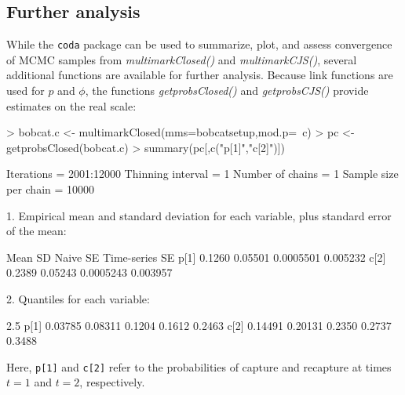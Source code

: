 \documentclass[12pt]{article}
\begin{document}
\subsection{Further analysis}
While the \verb|coda| package can be used to summarize, plot, and assess convergence of MCMC samples from \textit{multimarkClosed()} and \textit{multimarkCJS()}, several additional functions are available for further analysis. Because link functions are used for $p$ and $\phi$, the functions \textit{getprobsClosed()} and \textit{getprobsCJS()} provide estimates on the real scale:
\begin{Schunk}
\begin{Sinput}
> bobcat.c <- multimarkClosed(mms=bobcatsetup,mod.p=~c)
> pc <- getprobsClosed(bobcat.c)
> summary(pc[,c("p[1]","c[2]")])
\end{Sinput}
\begin{Soutput}
Iterations = 2001:12000
Thinning interval = 1 
Number of chains = 1 
Sample size per chain = 10000 

1. Empirical mean and standard deviation for each variable,
   plus standard error of the mean:

       Mean      SD  Naive SE Time-series SE
p[1] 0.1260 0.05501 0.0005501       0.005232
c[2] 0.2389 0.05243 0.0005243       0.003957

2. Quantiles for each variable:

        2.5%
p[1] 0.03785 0.08311 0.1204 0.1612 0.2463
c[2] 0.14491 0.20131 0.2350 0.2737 0.3488
\end{Soutput}
\end{Schunk}
Here, \verb|p[1]| and \verb|c[2]| refer to the probabilities of capture and recapture at times $t=1$ and $t=2$, respectively.
\end{document}
